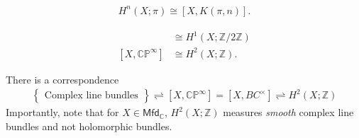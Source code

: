 \begin{theorem}

\begin{align*}
H^n(X; \pi) \cong [X, K( \pi, n) ]
.\end{align*}

\end{theorem}

\begin{example}[?]

\begin{align*}
[X, {\mathbb{RP}}^{\infty } ] &\cong H^1(X; {\mathbb{Z}}/2{\mathbb{Z}}) \\
[X, {\mathbb{CP}}^{\infty } ] &\cong H^2(X; {\mathbb{Z}})
.\end{align*}

\end{example}

\begin{proposition}[?]

There is a correspondence
\begin{align*}
\left\{{\substack{
  \text{Complex line bundles}
}}\right\}
\rightleftharpoons
[X, {\mathbb{CP}}^{\infty }] = [X, BC^{\times}]
\rightleftharpoons
H^2(X; {\mathbb{Z}})
\end{align*}
Importantly, note that for \(X \in {\mathsf{Mfd}}_{\mathbb{C}}\),
\(H^2(X; {\mathbb{Z}})\) measures \emph{smooth} complex line bundles and
not holomorphic bundles.

\end{proposition}

